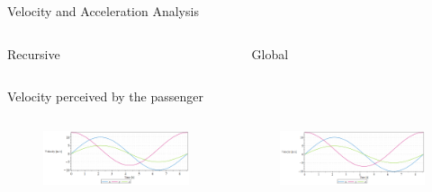 \documentclass{beamer}              %
\begin{document}
	\begin{frame}{Velocity and Acceleration Analysis}
		\begin{columns}
			\begin{column}{0.5\textwidth}
				\begin{block}{\centering Recursive}
				\end{block}
			\end{column}
			\begin{column}{0.5\textwidth}
				\begin{block}{\centering Global}
				\end{block}	
			\end{column}
		\end{columns}
		\centering Velocity perceived by the passenger
		\begin{columns}
			\begin{column}{0.5\textwidth}				
				\begin{figure}
					\includegraphics[width=150pt]{grafici/vel_pass_r.png}
				\end{figure}
			\end{column}
			\begin{column}{0.5\textwidth}
				\begin{figure}
					\includegraphics[width=150pt]{grafici/vel_pass_g.png}
				\end{figure}
			\end{column}
		\end{columns}	
		
		\medskip 
		

\end{frame}
\end{document}
